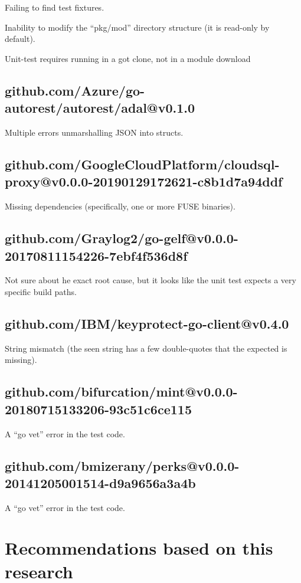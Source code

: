 \documentclass[a4paper]{paper}
\begin{document}
Failing to find test fixtures.

Inability to modify the ``pkg/mod'' directory structure (it is
read-only by default).

Unit-test requires running in a got clone, not in a module download

\subsection{github.com/Azure/go-autorest/autorest/adal@v0.1.0}

Multiple errors unmarshalling JSON into structs.

\subsection{github.com/GoogleCloudPlatform/cloudsql-proxy@v0.0.0-20190129172621-c8b1d7a94ddf}

Missing dependencies (specifically, one or more FUSE binaries).

\subsection{github.com/Graylog2/go-gelf@v0.0.0-20170811154226-7ebf4f536d8f}

Not sure about he exact root cause, but it looks like the unit test
expects a very specific build paths.

\subsection{github.com/IBM/keyprotect-go-client@v0.4.0}

String mismatch (the seen string has a few double-quotes that the
expected is missing).

\subsection{github.com/bifurcation/mint@v0.0.0-20180715133206-93c51c6ce115}

A ``go vet'' error in the test code.

\subsection{github.com/bmizerany/perks@v0.0.0-20141205001514-d9a9656a3a4b}

A ``go vet'' error in the test code.

\section{Recommendations based on this research}
\end{document}
